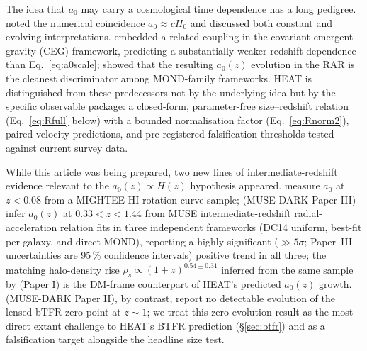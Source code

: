 \documentclass[twocolumn,letterpaper]{aastex631}
\newcommand{\azero}{a_0}
\begin{document}
The idea that $\azero$ may carry a cosmological time dependence
has a long pedigree.  \citet{Milgrom1999} noted the numerical
coincidence $\azero\!\approx\!cH_{0}$ and discussed both
constant and evolving interpretations.
\citet{Hossenfelder2017} embedded a related coupling in the
covariant emergent gravity (CEG) framework, predicting a
substantially weaker redshift dependence than
Eq.~\ref{eq:a0scale}; \citet{HossenfelderMistele2018} showed
that the resulting $\azero(z)$ evolution in the RAR is the
cleanest discriminator among MOND-family frameworks.  HEAT is
distinguished from these predecessors not by the underlying idea
but by the specific observable package: a closed-form,
parameter-free size--redshift relation (Eq.~\ref{eq:Rfull}
below) with a bounded normalisation factor
(Eq.~\ref{eq:Rnorm2}), paired velocity predictions, and
pre-registered falsification thresholds tested against current
survey data.

While this article was being prepared, two new lines of
intermediate-redshift evidence relevant to the
$\azero(z)\propto H(z)$ hypothesis appeared.
\citet{Varasteanu2025} measure $\azero$ at $z\!<\!0.08$ from a
MIGHTEE-HI rotation-curve sample; \citet{Ciocan2026RAR}
(MUSE-DARK Paper III) infer $\azero(z)$ at $0.33\!<\!z\!<\!1.44$
from MUSE intermediate-redshift radial-acceleration relation
fits in three independent frameworks (DC14 uniform, best-fit
per-galaxy, and direct MOND), reporting a highly significant ($\gg 5\sigma$; Paper~III uncertainties are 95\,\% confidence intervals)
positive trend in all three; the matching halo-density rise
$\rho_{s}\propto(1\!+\!z)^{0.54\pm 0.31}$ inferred from the same
sample by \citet{Ciocan2026Halo} (Paper I) is the
DM-frame counterpart of HEAT's predicted $\azero(z)$ growth.
\citet{Jeanneau2026} (MUSE-DARK Paper II), by contrast, report
no detectable evolution of the lensed bTFR zero-point at
$z\!\sim\!1$; we treat this zero-evolution result as the most
direct extant challenge to HEAT's BTFR prediction
(\S\ref{sec:btfr}) and as a falsification target alongside the
headline size test.
\end{document}

